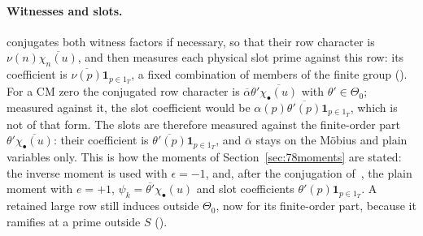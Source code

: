 \documentclass[11pt]{article}
\numberwithin{equation}{section}
\newcommand{\ind}{\mathbf1}
\begin{document}
\paragraph{Witnesses and slots.} \cite{OAI78} conjugates both witness factors if necessary, so that their row
character is $\nu(n)\overline{\chi_n(u)}$, and then measures each physical slot prime against this row: its
coefficient is $\overline{\nu(p)}\ind_{p\in1_T}$, a fixed combination of members of the finite group
(\cite[Section~19.2]{OAI78}). For a CM zero the conjugated row character is
$\overline\alpha\theta'\overline{\chi_\bullet(u)}$ with $\theta'\in\Theta_0$; measured against it, the slot coefficient
would be $\alpha(p)\overline{\theta'(p)}\ind_{p\in1_T}$, which is not of that form. The slots are therefore measured
against the finite-order part $\theta'\overline{\chi_\bullet(u)}$: their coefficient is
$\overline{\theta'(p)}\ind_{p\in1_T}$, and $\overline\alpha$ stays on the M\"obius and plain variables only. This is how
the moments of Section~\ref{sec:78moments} are stated: the inverse moment is used with $\epsilon=-1$, and, after the
conjugation of~\cite[Section~19.2]{OAI78}, the plain moment with $e=+1$, $\psi_k=\overline{\theta'}\chi_\bullet(u)$ and
slot coefficients $\theta'(p)\ind_{p\in1_T}$. A retained large row still induces outside $\Theta_0$, now for its
finite-order part, because it ramifies at a prime outside $S$ (\cite[Sections~8.1 and~19.2]{OAI78}).
\end{document}
